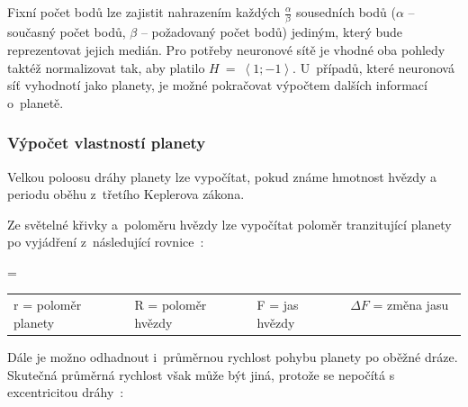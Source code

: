 \documentclass[a4paper,12pt]{article}
\begin{document}
{{\begin{multicols}{2}
\nasa
\end{multicols}

Fixní počet bodů lze zajistit nahrazením každých $\frac{\alpha}{\beta}$ sousedních bodů ($\alpha$ -- současný počet bodů, $\beta$ -- požadovaný počet bodů) jediným, který bude reprezentovat jejich medián. Pro potřeby neuronové sítě je vhodné oba pohledy taktéž normalizovat tak, aby platilo $H~=~\left<1; -1\right>$. U~případů, které neuronová síť vyhodnotí jako planety, je možné pokračovat výpočtem dalších informací o~planetě.~\cite{kepler80}

\subsubsection{Výpočet vlastností planety}

Velkou poloosu dráhy planety lze vypočítat, pokud známe hmotnost hvězdy a periodu oběhu z~třetího Keplerova zákona.~\cite{transitprops}


Ze světelné křivky a~poloměru hvězdy lze vypočítat poloměr tranzitující planety po vyjádření z~následující rovnice~\cite{transit,transitprops}:

 { = }{
\begin{tabular}{llll}
	r = poloměr planety & R = poloměr hvězdy & F = jas hvězdy & $\Delta F$ = změna jasu \
\end{tabular}
}

Dále je možno odhadnout i~průměrnou rychlost pohybu planety po oběžné dráze. Skutečná průměrná rychlost však může být jiná, protože se nepočítá s excentricitou dráhy~\cite{transitprops}:


}}
\end{document}
